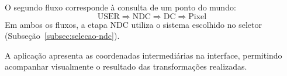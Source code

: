 O segundo fluxo corresponde à consulta de um ponto do mundo:
\[
    \text{USER} \Rightarrow \text{NDC} \Rightarrow \text{DC} \Rightarrow \text{Pixel}
\]
Em ambos os fluxos, a etapa NDC utiliza o sistema escolhido no seletor (Subseção~\ref{subsec:selecao-ndc}).

A aplicação apresenta as coordenadas intermediárias na interface, permitindo acompanhar visualmente o resultado das transformações realizadas.
